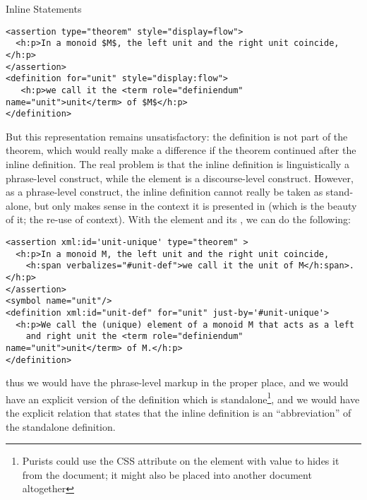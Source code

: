 \begin{omgroup}[short=Mathematical Statements,id=statements]
\begin{omgroup}[id=inline-statements]{Inline Statements}
\begin{module}[id=inline-statements]
\begin{lstlisting}[mathescape,caption=A Simple-Minded Representation of {\presbf{Theorem 3.12}}]
<assertion type="theorem" style="display=flow">
  <h:p>In a monoid $M$, the left unit and the right unit coincide,</h:p>
</assertion>
<definition for="unit" style="display:flow">
   <h:p>we call it the <term role="definiendum" name="unit">unit</term> of $M$</h:p>
</definition>
\end{lstlisting}

But this representation remains unsatisfactory: the definition is not part of the theorem,
which would really make a difference if the theorem continued after the inline
definition. The real problem is that the inline definition is linguistically a
phrase-level construct, while the  element is a discourse-level
construct. However, as a phrase-level construct, the inline definition cannot really be
taken as stand-alone, but only makes sense in the context it is presented in (which is the
beauty of it; the re-use of context). With the  element and its
, we can do the following:

\begin{lstlisting}[mathescape,caption=An Inline Definition]
<assertion xml:id='unit-unique' type="theorem" >
  <h:p>In a monoid M, the left unit and the right unit coincide,
    <h:span verbalizes="#unit-def">we call it the unit of M</h:span>.</h:p>
</assertion>
<symbol name="unit"/>
<definition xml:id="unit-def" for="unit" just-by='#unit-unique'>
  <h:p>We call the (unique) element of a monoid M that acts as a left 
    and right unit the <term role="definiendum" name="unit">unit</term> of M.</h:p>
</definition>
\end{lstlisting}

thus we would have the phrase-level markup in the proper place, and we would have an
explicit version of the definition which is standalone\footnote{Purists could use the CSS
  attribute  on the  element with
  value {} to hides it from the document; it might also
  be placed into another document altogether}, and we would have the explicit relation
that states that the inline definition is an ``abbreviation'' of the standalone
definition.
\end{module}
\end{omgroup}


\end{omgroup}
